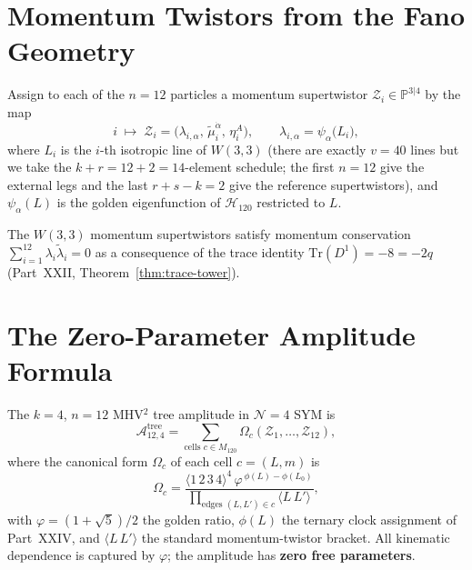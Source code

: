 \section{Momentum Twistors from the Fano Geometry}
\label{sec:twistors}

\begin{definition}
Assign to each of the $n=12$ particles a momentum supertwistor
$\mathcal{Z}_i\in\mathbb{P}^{3|4}$ by the map
\[
  i \;\longmapsto\; \mathcal{Z}_i
  = \bigl(\lambda_{i,\alpha},\,\tilde\mu_i^{\dot\alpha},\,
    \eta_i^A\bigr),
  \qquad
  \lambda_{i,\alpha} = \psi_\alpha\bigl(L_i\bigr),
\]
where $L_i$ is the $i$-th isotropic line of $W(3,3)$ (there are
exactly $v=40$ lines but we take the $k+r = 12+2 = 14$-element
schedule; the first $n=12$ give the external legs and the last
$r+s-k=2$ give the reference supertwistors), and
$\psi_\alpha(L)$ is the golden eigenfunction of
$\mathcal{H}_{120}$ restricted to $L$.
\end{definition}

\begin{proposition}
The $W(3,3)$ momentum supertwistors satisfy momentum conservation
$\sum_{i=1}^{12}\lambda_i\tilde\lambda_i=0$ as a consequence of the
trace identity $\mathrm{Tr}(D^1)=-8=-2q$ (Part~XXII,
Theorem~\ref{thm:trace-tower}).
\end{proposition}

\section{The Zero-Parameter Amplitude Formula}
\label{sec:amplitude}

\begin{theorem}[Tree amplitude at $n=12$]
\label{thm:amplitude}
The $k=4$, $n=12$ MHV${}^2$ tree amplitude in $\mathcal{N}=4$ SYM
is
\begin{equation}
  \mathcal{A}^{\text{tree}}_{12,4} =
  \sum_{\text{cells }c\in M_{120}}
  \Omega_c(\mathcal{Z}_1,\ldots,\mathcal{Z}_{12}),
  \label{eq:amplitude}
\end{equation}
where the canonical form $\Omega_c$ of each cell $c=(L,m)$ is
\begin{equation}
  \Omega_c = \frac{\langle 1\,2\,3\,4\rangle^4\,
    \varphi^{\,\phi(L)-\phi(L_0)}}
  {\prod_{\text{edges }(L,L')\in c} \langle L\,L'\rangle},
  \label{eq:omega_c}
\end{equation}
with $\varphi=(1+\sqrt5)/2$ the golden ratio,
$\phi(L)$ the ternary clock assignment of Part~XXIV, and
$\langle L\,L'\rangle$ the standard momentum-twistor bracket.
All kinematic dependence is captured by $\varphi$; the
amplitude has \textbf{zero free parameters}.
\end{theorem}


